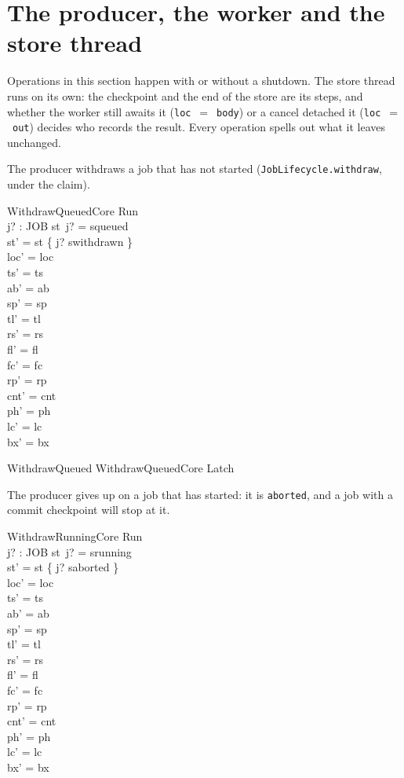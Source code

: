 \documentclass[a4paper,10pt,fleqn]{article}
\newcommand{\field}[1]{\texttt{#1}}
\begin{document}
\section{The producer, the worker and the store thread}
\label{sec:worker}

Operations in this section happen with or without a shutdown. The store thread
runs on its own: the checkpoint and the end of the store are its steps, and
whether the worker still awaits it (\field{loc}~$=$~\field{body}) or a cancel
detached it (\field{loc}~$=$~\field{out}) decides who records the result.
Every operation spells out what it leaves unchanged.

The producer withdraws a job that has not started (\field{JobLifecycle.withdraw},
under the claim).

\begin{schema}{WithdrawQueuedCore}
\Delta Run \\ j? : JOB
\where
st~j? = squeued \\
st' = st \oplus \{ j? \mapsto swithdrawn \} \\
loc' = loc \\
ts' = ts \\
ab' = ab \\
sp' = sp \\
tl' = tl \\
rs' = rs \\
fl' = fl \\
fc' = fc \\
rp' = rp \\
cnt' = cnt \\
ph' = ph \\
lc' = lc \\
bx' = bx
\end{schema}

\begin{zed}
WithdrawQueued  WithdrawQueuedCore \land Latch
\end{zed}

The producer gives up on a job that has started: it is \field{aborted}, and a
job with a commit checkpoint will stop at it.

\begin{schema}{WithdrawRunningCore}
\Delta Run \\ j? : JOB
\where
st~j? = srunning \\
st' = st \oplus \{ j? \mapsto saborted \} \\
loc' = loc \\
ts' = ts \\
ab' = ab \\
sp' = sp \\
tl' = tl \\
rs' = rs \\
fl' = fl \\
fc' = fc \\
rp' = rp \\
cnt' = cnt \\
ph' = ph \\
lc' = lc \\
bx' = bx
\end{schema}
\end{document}
